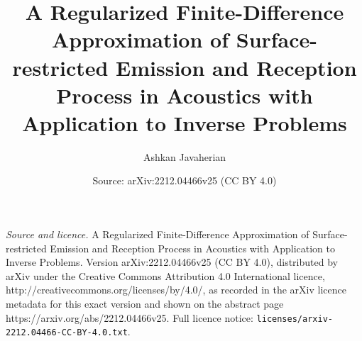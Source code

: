 \documentclass[10pt,a4paper]{amsart}
\title{A Regularized Finite-Difference Approximation of Surface-restricted Emission and Reception Process in Acoustics with Application to Inverse Problems}
\author{Ashkan Javaherian}
\date{Source: arXiv:2212.04466v25 (CC BY 4.0)}
\begin{document}
\maketitle

\noindent\emph{Source and licence.} A Regularized Finite-Difference Approximation of Surface-restricted Emission and Reception Process in Acoustics with Application to Inverse Problems. Version arXiv:2212.04466v25 (CC BY 4.0), distributed by arXiv under the Creative Commons Attribution 4.0 International licence, http://creativecommons.org/licenses/by/4.0/, as recorded in the arXiv licence metadata for this exact version and shown on the abstract page https://arxiv.org/abs/2212.04466v25. Full licence notice: \texttt{licenses/arxiv-2212.04466-CC-BY-4.0.txt}.\par\smallskip
\end{document}

